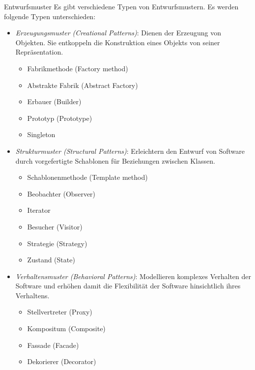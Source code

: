 \begin{defi}{Entwurfsmuster}
    Es gibt verschiedene Typen von Entwurfsmustern.
    Es werden folgende Typen unterschieden:
    \begin{itemize}
        \item \emph{Erzeugungsmuster (Creational Patterns)}:
              Dienen der Erzeugung von Objekten. Sie entkoppeln die Konstruktion eines Objekts von seiner Repräsentation.
              \begin{itemize}
                  \item Fabrikmethode (Factory method)
                  \item Abstrakte Fabrik (Abstract Factory)
                  \item Erbauer (Builder)
                  \item Prototyp (Prototype)
                  \item Singleton
              \end{itemize}
        \item \emph{Strukturmuster (Structural Patterns)}:
              Erleichtern den Entwurf von Software durch vorgefertigte Schablonen für Beziehungen zwischen Klassen.
              \begin{itemize}
                  \item Schablonenmethode (Template method)
                  \item Beobachter (Observer)
                  \item Iterator
                  \item Besucher (Visitor)
                  \item Strategie (Strategy)
                  \item Zustand (State)
              \end{itemize}
        \item \emph{Verhaltensmuster (Behavioral Patterns)}:
              Modellieren komplexes Verhalten der Software und erhöhen damit die Flexibilität der Software hinsichtlich ihres Verhaltens.
              \begin{itemize}
                  \item Stellvertreter (Proxy)
                  \item Kompositum (Composite)
                  \item Fassade (Facade)
                  \item Dekorierer (Decorator)
              \end{itemize}
    \end{itemize}
\end{defi}

